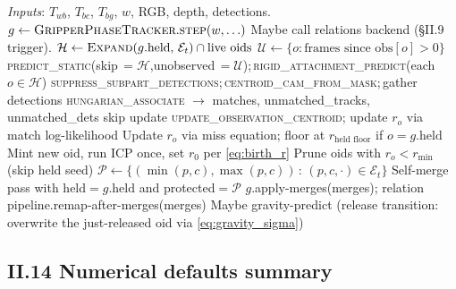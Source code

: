 \documentclass[11pt]{article}
\begin{document}
\begin{algorithm}[H]
\caption{One frame of the Bernoulli-EKF tracker.}
\begin{algorithmic}[1]
\State \emph{Inputs}: $T_{wb}$, $T_{bc}$, $T_{bg}$, $w$, RGB, depth, detections.
\State $g \gets \textsc{GripperPhaseTracker}.\textsc{step}(w, \ldots)$
\State Maybe call relations backend (\S II.9 trigger).
\State $\mathcal{H} \gets \textsc{Expand}(g.\text{held},\,\mathcal{E}_t)\cap\text{live oids}$
\State $\mathcal{U} \gets \{o : \text{frames since obs}[o] > 0\}$ 
\State \textsc{predict\_static}(skip\,$=\!\mathcal{H}$,\;unobserved\,$=\!\mathcal{U}$);\,\textsc{rigid\_attachment\_predict}(each $o\in\mathcal{H}$)
\State \textsc{suppress\_subpart\_detections};\,\textsc{centroid\_cam\_from\_mask};\,gather detections
\State \textsc{hungarian\_associate} $\to$ matches, unmatched\_tracks, unmatched\_dets
   skip update \EndIf
  \State \textsc{update\_observation\_centroid}; update $r_o$ via match log-likelihood
\EndFor
{}
  \State Update $r_o$ via miss equation; floor at $r_{\text{held floor}}$ if $o = g.\text{held}$
\EndFor
{}
    \State Mint new oid, run ICP once, set $r_0$ per \eqref{eq:birth_r}
  \EndIf
\EndFor
\State Prune oids with $r_o < r_{\min}$ (skip held seed)
\State $\mathcal{P} \gets \{(\min(p,c),\max(p,c))\,:\,(p,c,\cdot)\in\mathcal{E}_t\}$
\State Self-merge pass with held$=g.\text{held}$ and protected$=\mathcal{P}$
\State $g$.apply-merges(merges); relation pipeline.remap-after-merges(merges)
\State Maybe gravity-predict (release transition: overwrite the just-released oid via \eqref{eq:gravity_sigma})
\end{algorithmic}
\end{algorithm}

\subsection*{II.14 Numerical defaults summary}
\end{document}
